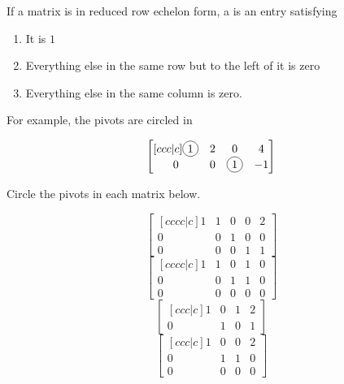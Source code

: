 \begin{applicationActivities}{2}{4}
\begin{definition}
If a matrix is in reduced row echelon form, a  is an entry satisfying
\begin{enumerate}[1.]
\item It is $1$
\item Everything else in the same row but to the left of it is zero
\item Everything else in the same column is zero.
\end{enumerate}

For example, the pivots are circled in 

\[\begin{bmatrix}[ccc|c] \circledNumber{1} & 2 & 0 & 4 \\ 0 & 0 & \circledNumber{1} & -1 \end{bmatrix}\]
\end{definition}


\begin{activity}{5}
Circle the pivots in each matrix below.
\begin{multicols}{2}
\[ \begin{bmatrix}[cccc|c] 1 & 1 & 0 & 0 & 2 \\ 0 & 0 & 1 & 0 &  0 \\ 0 & 0 & 0 &  1 & 1 \end{bmatrix} \]
\[ \begin{bmatrix}[cccc|c] 1 & 1 & 0 & 1 & 0 \\ 0 & 0 & 1 & 1 & 0 \\ 0 & 0 & 0 & 0  & 0 \end{bmatrix} \]
\[ \begin{bmatrix}[ccc|c] 1 & 0 & 1 & 2 \\ 0 & 1 & 0 & 1 \end{bmatrix} \]
\[ \begin{bmatrix}[ccc|c] 1 & 0 & 0 & 2 \\ 0 & 1 & 1 & 0 \\ 0 & 0 & 0 & 0 \end{bmatrix} \]
\end{multicols}
\end{activity}


\end{applicationActivities}
